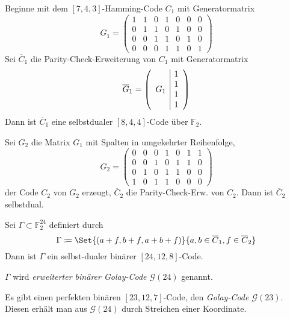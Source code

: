 \documentclass{cheat-sheet}
\newcommand{\F}{\mathbb{F}} %
\newcommand{\Golay}{\mathcal{G}} %
\begin{document}
\begin{konstr}
  Beginne mit dem $[7, 4, 3]$-Hamming-Code $C_1$ mit Generatormatrix
  \[
    G_1 = \begin{pmatrix}
      1 & 1 & 0 & 1 & 0 & 0 & 0 \\
      0 & 1 & 1 & 0 & 1 & 0 & 0 \\
      0 & 0 & 1 & 1 & 0 & 1 & 0 \\
      0 & 0 & 0 & 1 & 1 & 0 & 1
    \end{pmatrix}
  \]
  Sei $\overline{C}_1$ die Parity-Check-Erweiterung von $C_1$ mit Generatormatrix
  \[
    \overline{G}_1 = \left( \begin{array}{c | c}
      \multirow{4}{*}{$G_1$} & 1 \\
      & 1 \\
      & 1 \\
      & 1
    \end{array} \right)
  \]
  Dann ist $\overline{C}_1$ eine selbstdualer $[8,4,4]$-Code über $\F_2$.
  
  Sei $G_2$ die Matrix $G_1$ mit Spalten in umgekehrter Reihenfolge,
  \[
    G_2 = \begin{pmatrix}
      0 & 0 & 0 & 1 & 0 & 1 & 1 \\
      0 & 0 & 1 & 0 & 1 & 1 & 0 \\
      0 & 1 & 0 & 1 & 1 & 0 & 0 \\
      1 & 0 & 1 & 1 & 0 & 0 & 0
    \end{pmatrix}
  \]
  der Code $C_2$ von $G_2$ erzeugt, $\overline{C}_2$ die Parity-Check-Erw. von $C_2$.
  Dann ist $\overline{C}_2$ selbstdual.
\end{konstr}

\begin{satz}
  Sei $\Gamma \subset \F_2^{24}$ definiert durch
  \[ \Gamma \coloneqq \Set{(a+f, b+f, a+b+f)}{a, b \in \overline{C}_1, f \in \overline{C}_2} \]
  Dann ist $\Gamma$ ein selbst-dualer binärer $[24, 12, 8]$-Code.
\end{satz}

\begin{defn}
  $\Gamma$ wird \emph{erweiterter binärer Golay-Code $\Golay(24)$} genannt.
\end{defn}


\begin{satz}
  Es gibt einen perfekten binären $[23, 12, 7]$-Code, den \emph{Golay-Code $\Golay(23)$}.
  Diesen erhält man aus $\Golay(24)$ durch Streichen einer Koordinate.
\end{satz}
\end{document}
